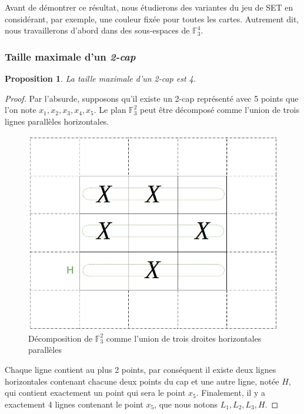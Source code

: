 \documentclass[a4paper,12pt,titlepage]{article}
\theoremstyle{plain}
\newtheorem{prop}{Proposition}
\theoremstyle{definition}
\newcommand{\Ftrois}[1]{\mathbb{F}^#1_3}
\begin{document}
Avant de démontrer ce résultat, nous étudierons des variantes du jeu de SET en considérant, par exemple, une couleur fixée pour toutes les cartes. Autrement dit, nous travaillerons d'abord dans des sous-espaces de  $\Ftrois{4}$.

\subsubsection{Taille maximale d'un \emph{2-cap}}
\begin{prop} \label{prop:2cap}
La taille maximale d'un \emph{2-cap} est 4.
\end{prop}
\begin{proof}  
Par l'absurde, supposons qu'il existe un 2-cap représenté avec 5 points que l'on note $x_1,x_2,x_3,x_4,x_5$. Le plan $\Ftrois{2}$ peut être décomposé comme l'union de trois lignes parallèles horizontales.

\begin{figure}[h!] %
\centering
\includegraphics[scale=0.4]{Img/FigProp1v2.jpg}
\caption{Décomposition de $\Ftrois{2}$ comme l'union de trois droites horizontales parallèles}
\end{figure}

Chaque ligne contient au plus 2 points, par conséquent il existe deux lignes horizontales contenant chacune deux points du cap et une autre ligne, notée $H$, qui contient exactement un point qui sera le point $x_5$. Finalement, il y a exactement 4 lignes contenant le point $x_5$, que nous notons $L_1,L_2,L_3,H$. %


\end{proof}
\end{document}
